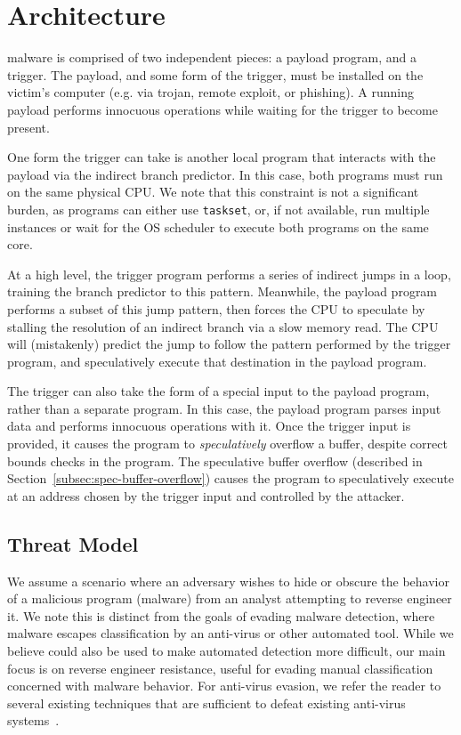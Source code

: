 

\section{Architecture}
\speculake malware is comprised of two independent pieces: a payload program,
and a trigger. The payload, and some form of the trigger, must be installed
on the victim's computer (e.g. via trojan, remote exploit, or phishing). A running
payload performs innocuous operations while waiting for the trigger to
become present.

One form the trigger can take is another local program that interacts with the
payload via the indirect branch predictor. In this case, both programs must run
on the same physical CPU. We note that this constraint is not a significant
burden, as programs can either use \texttt{taskset}, or, if not available, run
multiple instances or wait for the OS scheduler to execute both programs on
the same core.

At a high level, the trigger program performs a series of indirect jumps in a
loop, training the branch predictor to this pattern. Meanwhile, the
payload program performs a subset of this jump pattern, then forces the CPU to
speculate by stalling the resolution of an indirect branch via a slow memory
read. The CPU will (mistakenly) predict the jump to follow the pattern performed
by the trigger program, and speculatively execute that destination in the
payload program.

The trigger can also take the form of a special input to the payload program,
rather than a separate program.
In this case, the payload program parses input data and performs innocuous
operations with it. Once the trigger input is provided, it causes the program to
\emph{speculatively} overflow a buffer, despite correct bounds checks in the program.
The speculative buffer overflow (described in
Section~\ref{subsec:spec-buffer-overflow}) causes the program to speculatively
execute at an address chosen by the trigger input and controlled by the
attacker.


\subsection{Threat Model}

We assume a scenario where an adversary wishes to hide or obscure the behavior
of a malicious program (malware) from an analyst attempting to reverse engineer
it. We note this is distinct from the goals of evading malware detection, where
malware escapes classification by an anti-virus or other automated tool. While
we believe \speculake could also be used to make automated detection more
difficult, our main focus is on reverse engineer resistance, useful for evading
manual classification concerned with malware behavior. For anti-virus evasion,
we refer the reader to several existing techniques that are sufficient to defeat
existing anti-virus
systems~\cite{jana2012abusing,oberheide2009polypack,ropinjector,swinnen2014one,ugarte2015sok}.


